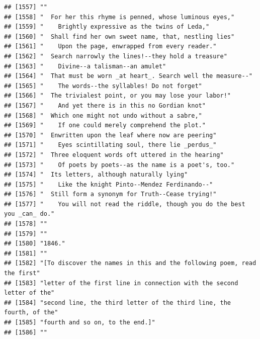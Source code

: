 \documentclass{article}\usepackage[]{graphicx}\usepackage[]{color}
\makeatletter
\newenvironment{kframe}{%
 \def\at@end@of@kframe{}%
 \ifinner\ifhmode%
  \def\at@end@of@kframe{\end{minipage}}%
  \begin{minipage}{\columnwidth}%
 \fi\fi%
 \def\FrameCommand##1{\hskip\@totalleftmargin \hskip-\fboxsep
 \colorbox{shadecolor}{##1}\hskip-\fboxsep
     \hskip-\linewidth \hskip-\@totalleftmargin \hskip\columnwidth}%
 \MakeFramed {\advance\hsize-\width
   \@totalleftmargin\z@ \linewidth\hsize
   \@setminipage}}%
 {\par\unskip\endMakeFramed%
 \at@end@of@kframe}
\newenvironment{knitrout}{}{} %
\makeatother
\begin{document}
\begin{knitrout}
\begin{kframe}
\begin{verbatim}
## [1557] ""                                                                            
## [1558] "  For her this rhyme is penned, whose luminous eyes,"                        
## [1559] "    Brightly expressive as the twins of Leda,"                               
## [1560] "  Shall find her own sweet name, that, nestling lies"                        
## [1561] "    Upon the page, enwrapped from every reader."                             
## [1562] "  Search narrowly the lines!--they hold a treasure"                          
## [1563] "    Divine--a talisman--an amulet"                                           
## [1564] "  That must be worn _at heart_. Search well the measure--"                   
## [1565] "    The words--the syllables! Do not forget"                                 
## [1566] "  The trivialest point, or you may lose your labor!"                         
## [1567] "    And yet there is in this no Gordian knot"                                
## [1568] "  Which one might not undo without a sabre,"                                 
## [1569] "    If one could merely comprehend the plot."                                
## [1570] "  Enwritten upon the leaf where now are peering"                             
## [1571] "    Eyes scintillating soul, there lie _perdus_"                             
## [1572] "  Three eloquent words oft uttered in the hearing"                           
## [1573] "    Of poets by poets--as the name is a poet's, too."                        
## [1574] "  Its letters, although naturally lying"                                     
## [1575] "    Like the knight Pinto--Mendez Ferdinando--"                              
## [1576] "  Still form a synonym for Truth--Cease trying!"                             
## [1577] "    You will not read the riddle, though you do the best you _can_ do."      
## [1578] ""                                                                            
## [1579] ""                                                                            
## [1580] "1846."                                                                       
## [1581] ""                                                                            
## [1582] "[To discover the names in this and the following poem, read the first"       
## [1583] "letter of the first line in connection with the second letter of the"        
## [1584] "second line, the third letter of the third line, the fourth, of the"         
## [1585] "fourth and so on, to the end.]"                                              
## [1586] ""                                                                            

\end{verbatim}
\end{kframe}
\end{knitrout}
\end{document}
